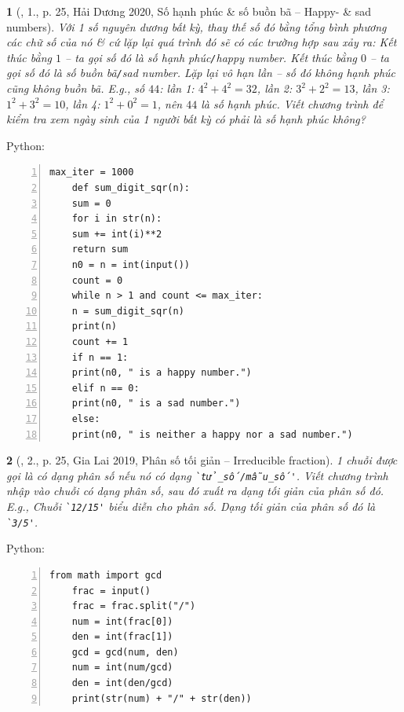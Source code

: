 \documentclass{article}
\newtheorem{baitoan}{}
\begin{document}
\begin{baitoan}[\cite{VietSTEM2021}, 1., p. 25, Hải Dương 2020, Số hạnh phúc \& số buồn bã -- Happy- \& sad numbers]
	Với 1 số nguyên dương bất kỳ, thay thế số đó bằng tổng bình phương các chữ số của nó \& cứ lặp lại quá trình đó sẽ có các trường hợp sau xảy ra: Kết thúc bằng $1$ -- ta gọi số đó là \emph{số hạnh phúc{\tt/}happy number}. Kết thúc bằng $0$ -- ta gọi số đó là \emph{số buồn bã{\tt/}sad number}. Lặp lại vô hạn lần -- số đó không hạnh phúc cũng không buồn bã. E.g., số $44$: lần 1: $4^2 + 4^2 = 32$, lần 2: $3^2 + 2^2 = 13$, lần 3: $1^2 + 3^2 = 10$, lần 4: $1^2 + 0^2 = 1$, nên $44$ là số hạnh phúc. Viết chương trình để kiểm tra xem ngày sinh của 1 người bất kỳ có phải là số hạnh phúc không?
\end{baitoan}
Python:
\begin{Verbatim}[numbers=left,xleftmargin=5mm]
	max_iter = 1000
	def sum_digit_sqr(n):
	sum = 0 
	for i in str(n):
	sum += int(i)**2
	return sum
	n0 = n = int(input())
	count = 0
	while n > 1 and count <= max_iter:
	n = sum_digit_sqr(n)
	print(n)
	count += 1
	if n == 1:
	print(n0, " is a happy number.")
	elif n == 0:
	print(n0, " is a sad number.")
	else:
	print(n0, " is neither a happy nor a sad number.")
\end{Verbatim}

\begin{baitoan}[\cite{VietSTEM2021}, 2., p. 25, Gia Lai 2019, Phân số tối giản -- Irreducible fraction]
	1 chuỗi được gọi là có dạng phân số nếu nó có dạng \verb|`tử_số/mẫu_số'|. Viết chương trình nhập vào chuỗi có dạng phân số, sau đó xuất ra dạng tối giản của phân số đó. E.g., Chuỗi \verb|`12/15'| biểu diễn cho phân số. Dạng tối giản của phân số đó là \verb|`3/5'|.
\end{baitoan}
Python:
\begin{Verbatim}[numbers=left,xleftmargin=5mm]
	from math import gcd
	frac = input()
	frac = frac.split("/")
	num = int(frac[0])
	den = int(frac[1])
	gcd = gcd(num, den)
	num = int(num/gcd)
	den = int(den/gcd)
	print(str(num) + "/" + str(den))
\end{Verbatim}
\end{document}
